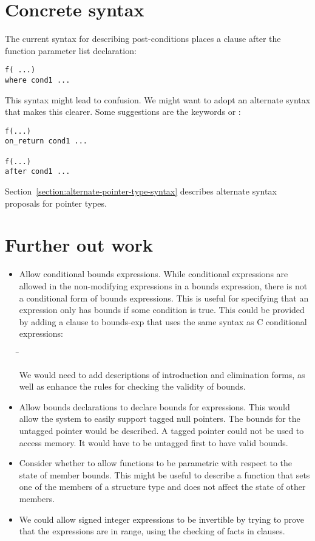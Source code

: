 \section{Concrete syntax}
 
The current syntax for describing post-conditions places a 
clause after the function parameter list declaration:

\begin{lstlisting}
f( ...)
where cond1 ...
\end{lstlisting}

This syntax might lead to confusion. We might want to adopt an alternate
syntax that makes this clearer. Some suggestions are the keywords
 or :

\begin{lstlisting}
f(...)
on_return cond1 ...

f(...)
after cond1 ...
\end{lstlisting}

Section~\ref{section:alternate-pointer-type-syntax} describes alternate
syntax proposals for pointer types.

\section{Further out work}
\begin{itemize}
\item Allow conditional bounds expressions.   While conditional
expressions are allowed in the non-modifying expressions in a bounds expression, 
there is not a conditional form of bounds expressions.  This is useful for
specifying that an expression only has bounds if some condition is true.
This could be provided by adding a clause to bounds-exp that uses the
same syntax as C conditional expressions:
\begin{tabbing}
\= \\
\>   \code{:} 
\end{tabbing}

We would need to add descriptions of introduction and elimination
forms, as well as enhance the rules for checking the validity of bounds.

\item Allow bounds declarations to declare bounds for expressions.
This would allow the system to easily support tagged null pointers.
The bounds for the untagged pointer would be described. 
A tagged pointer could not be used to access memory.  It would have to be
untagged first  to have valid bounds.

\item Consider whether to allow functions to be
parametric with respect to the state of member bounds. This might be
useful to describe a function that sets one of the members of a
structure type and does not affect the state of other members.

\item We could allow signed integer expressions to be invertible
by trying to prove that the expressions are in range, using the
checking of facts in  clauses.
\end{itemize}

